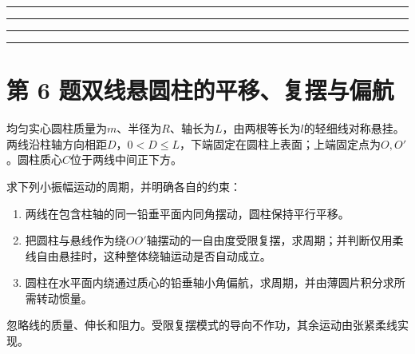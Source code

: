 \documentclass[UTF8,fontset=fandol,a4paper,11pt]{ctexart}
\newcommand{\workarea}{\par\vspace{7mm}\noindent{\small\color{muted}作答区}\par\vspace{4mm}
\noindent\textcolor{rulegray}{\rule{\linewidth}{0.3pt}}\par\vspace{16mm}
\noindent\textcolor{rulegray}{\rule{\linewidth}{0.3pt}}\par\vspace{16mm}
\noindent\textcolor{rulegray}{\rule{\linewidth}{0.3pt}}\par\vspace{16mm}
\noindent\textcolor{rulegray}{\rule{\linewidth}{0.3pt}}}
\begin{document}
\workarea

\clearpage


\section*{第 6 题\quad 双线悬圆柱的平移、复摆与偏航}\label{q:6}


均匀实心圆柱质量为$m$、半径为$R$、轴长为$L$，由两根等长为$l$的轻细线对称悬挂。两线沿柱轴方向相距$D$，$0<D\le L$，下端固定在圆柱上表面；上端固定点为$O,O'$。圆柱质心$C$位于两线中间正下方。

求下列小振幅运动的周期，并明确各自的约束：
\begin{enumerate}
\item 两线在包含柱轴的同一铅垂平面内同角摆动，圆柱保持平行平移。
\item 把圆柱与悬线作为绕$OO'$轴摆动的一自由度受限复摆，求周期；并判断仅用柔线自由悬挂时，这种整体绕轴运动是否自动成立。
\item 圆柱在水平面内绕通过质心的铅垂轴小角偏航，求周期，并由薄圆片积分求所需转动惯量。
\end{enumerate}
忽略线的质量、伸长和阻力。受限复摆模式的导向不作功，其余运动由张紧柔线实现。
\end{document}
